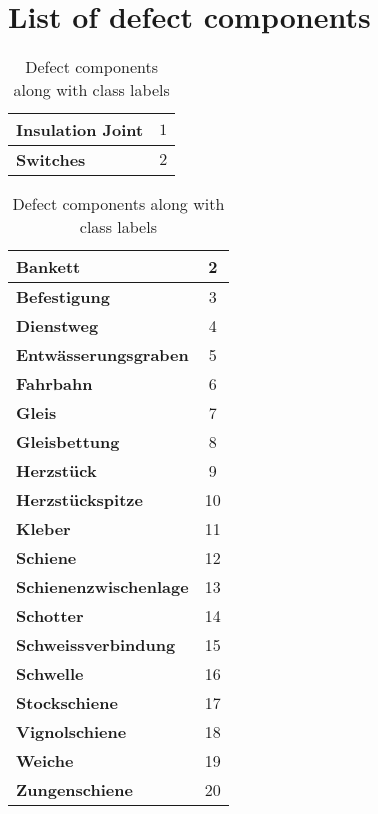 \section{List of defect components}
\label{app:defcomp}
\begin{table}[H]
	\centering
	\begin{tabular}{|l|c|} \hline
		\textbf{Insulation Joint} & $1$ \\ \hline
		\textbf{Switches} & $2$ \\ \hline 
	\end{tabular}
	\hspace*{0.5cm}	
	\begin{tabular}{|l|c|} \hline
		\textbf{Bankett} & 2 \\ \hline 
		\textbf{Befestigung} & 3\\ \hline
		\textbf{Dienstweg} & 4\\ \hline
		\textbf{Entwässerungsgraben} & 5\\ \hline
		\textbf{Fahrbahn} & 6\\ \hline
		\textbf{Gleis} & 7\\ \hline
		\textbf{Gleisbettung} & 8\\ \hline
		\textbf{Herzstück} & 9\\ \hline
		\textbf{Herzstückspitze} & 10\\ \hline
		\textbf{Kleber} & 11\\ \hline
		\textbf{Schiene} & 12\\ \hline
		\textbf{Schienenzwischenlage} & 13\\ \hline
		\textbf{Schotter} & 14\\ \hline
		\textbf{Schweissverbindung} & 15\\ \hline
		\textbf{Schwelle} & 16\\ \hline
		\textbf{Stockschiene} & 17\\ \hline
		\textbf{Vignolschiene} & 18\\ \hline
		\textbf{Weiche} & 19\\ \hline
		\textbf{Zungenschiene} & 20\\ \hline
	\end{tabular}
	\caption{Defect components along with class labels}
\end{table}

